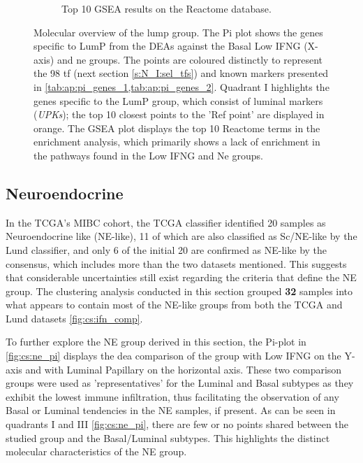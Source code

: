 \begin{figure}[H]
\begin{subfigure}[!t]{0.91\textwidth}
        \caption{Top 10 GSEA results on the Reactome database.}
        \label{fig:cs:lumP_gsea}
    \end{subfigure} 
    \centering
    \caption[LumP like: overview of the molecular properties]{Molecular overview of the \acrfull{lump} group. The Pi plot shows the genes specific to LumP from the DEAs against the Basal Low IFNG (X-axis) and \acrlong{ne} groups. The points are coloured distinctly to represent the 98 \acrlong{tf} (next section \cref{s:N_I:sel_tfs}) and known markers presented in \cref{tab:ap:pi_genes_1,tab:ap:pi_genes_2}. Quadrant I highlights the genes specific to the LumP group, which consist of luminal markers (\textit{UPKs}); the top 10 closest points to the 'Ref point' are displayed in orange. The GSEA plot displays the top 10 Reactome terms in the enrichment analysis, which primarily shows a lack of enrichment in the pathways found in the Low IFNG and Ne groups.}
    \label{fig:cs:lump}
\end{figure}


\subsection{Neuroendocrine} \label{s:cs:ne_interp}


In the TCGA's MIBC cohort, the TCGA classifier \citet{Robertson2017-mg} identified 20 samples as Neuroendocrine like (NE-like), 11 of which are also classified as Sc/NE-like by the Lund classifier, and only 6 of the initial 20 are confirmed as NE-like by the consensus, which includes more than the two datasets mentioned. This suggests that considerable uncertainties still exist regarding the criteria that define the NE group. The clustering analysis conducted in this section grouped \textbf{32} samples into what appears to contain most of the NE-like groups from both the TCGA and Lund datasets \cref{fig:cs:ifn_comp}.

To further explore the NE group derived in this section, the Pi-plot in \cref{fig:cs:ne_pi} displays the \acrshort{dea} comparison of the group with Low IFNG on the Y-axis and with Luminal Papillary on the horizontal axis. These two comparison groups were used as 'representatives' for the Luminal and Basal subtypes as they exhibit the lowest immune infiltration, thus facilitating the observation of any Basal or Luminal tendencies in the NE samples, if present. As can be seen in quadrants I and III \cref{fig:cs:ne_pi}, there are few or no points shared between the studied group and the Basal/Luminal subtypes. This highlights the distinct molecular characteristics of the NE group.


